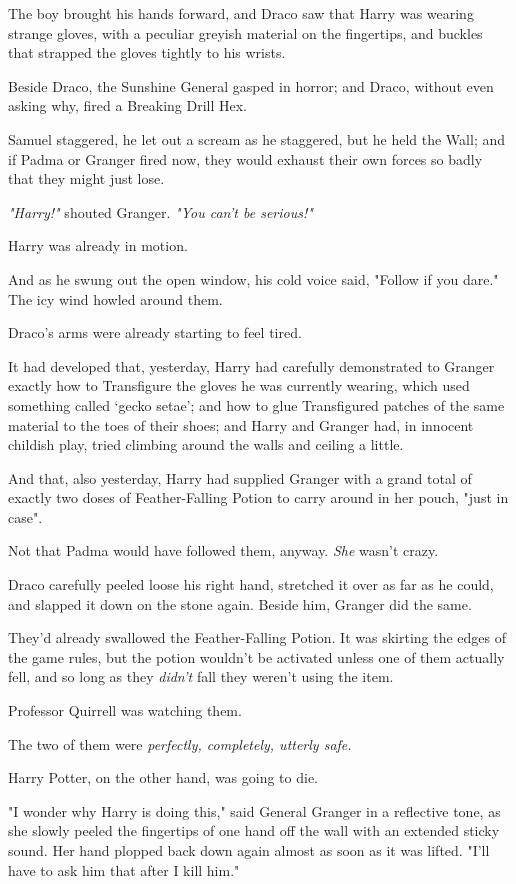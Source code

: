 The boy brought his hands forward, and Draco saw that Harry was wearing strange
gloves, with a peculiar greyish material on the fingertips, and buckles that
strapped the gloves tightly to his wrists.

Beside Draco, the Sunshine General gasped in horror; and Draco, without even
asking why, fired a Breaking Drill Hex.

Samuel staggered, he let out a scream as he staggered, but he held the Wall;
and if Padma or Granger fired now, they would exhaust their own forces so badly
that they might just lose.

\emph{"Harry!"} shouted Granger. \emph{"You can't be serious!"}

Harry was already in motion.

And as he swung out the open window, his cold voice said, "Follow if you dare."
\sbreak
The icy wind howled around them.

Draco's arms were already starting to feel tired.

{\el} It had developed that, yesterday, Harry had carefully demonstrated to
Granger exactly how to Transfigure the gloves he was currently wearing, which
used something called `gecko setae'; and how to glue Transfigured patches of
the same material to the toes of their shoes; and Harry and Granger had, in
innocent childish play, tried climbing around the walls and ceiling a little.

And that, also yesterday, Harry had supplied Granger with a grand total of
exactly two doses of Feather-Falling Potion to carry around in her pouch, "just
in case".

Not that Padma would have followed them, anyway. \emph{She} wasn't crazy.

Draco carefully peeled loose his right hand, stretched it over as far as he
could, and slapped it down on the stone again. Beside him, Granger did the same.

They'd already swallowed the Feather-Falling Potion. It was skirting the edges
of the game rules, but the potion wouldn't be activated unless one of them
actually fell, and so long as they \emph{didn't} fall they weren't using the
item.

Professor Quirrell was watching them.

The two of them were \emph{perfectly, completely, utterly safe.}

Harry Potter, on the other hand, was going to die.

"I wonder why Harry is doing this," said General Granger in a reflective tone,
as she slowly peeled the fingertips of one hand off the wall with an extended
sticky sound. Her hand plopped back down again almost as soon as it was lifted.
"I'll have to ask him that after I kill him."

